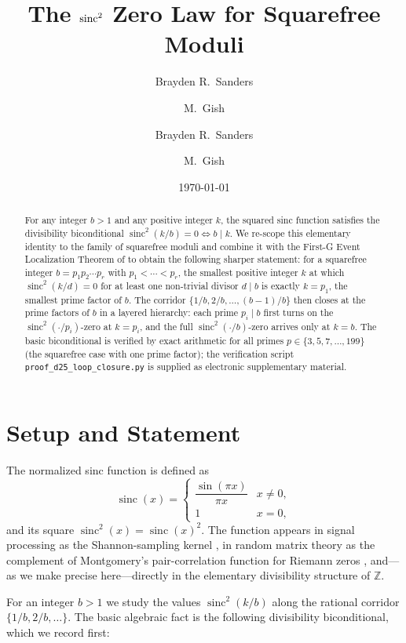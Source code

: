 \documentclass[11pt,reqno]{amsart}
\title[The sinc\texorpdfstring{$^2$}{\^{}2} zero law for squarefree moduli]{The \texorpdfstring{$\sinc^2$}{sinc\^{}2} Zero Law for Squarefree Moduli}
\author{Brayden R.\ Sanders \and M.\ Gish}
\author{Brayden R.\ Sanders \and M.\ Gish}
\date{\today}
\theoremstyle{plain}
\theoremstyle{remark}
\DeclareMathOperator{\sinc}{sinc}
\newcommand{\Z}{\mathbb{Z}}
\begin{document}
\begin{abstract}
For any integer $b > 1$ and any positive integer $k$, the squared
sinc function satisfies the divisibility biconditional
$\sinc^2(k/b) = 0 \iff b \mid k$. We re-scope this elementary
identity to the family of squarefree moduli and combine it with the
First-G Event Localization Theorem of \cite{J41} to obtain the
following sharper statement: for a squarefree integer
$b = p_1 p_2 \cdots p_r$ with $p_1 < \cdots < p_r$, the smallest
positive integer $k$ at which $\sinc^2(k/d) = 0$ for at least one
non-trivial divisor $d \mid b$ is exactly $k = p_1$, the smallest
prime factor of $b$. The corridor
$\{1/b, 2/b, \ldots, (b-1)/b\}$ then closes at the prime factors of
$b$ in a layered hierarchy: each prime $p_i \mid b$ first turns on
the $\sinc^2(\cdot/p_i)$-zero at $k = p_i$, and the full
$\sinc^2(\cdot/b)$-zero arrives only at $k = b$. The basic
biconditional is verified by exact arithmetic for all primes
$p \in \{3, 5, 7, \ldots, 199\}$ (the squarefree case with one prime
factor); the verification script
\texttt{proof\_d25\_loop\_closure.py} is supplied as electronic
supplementary material.
\end{abstract}

\maketitle

\section{Setup and Statement}\label{sec:setup}

The normalized sinc function is defined as
\begin{equation}\label{eq:sinc-def}
  \sinc(x) =
  \begin{cases}
     \dfrac{\sin(\pi x)}{\pi x} & x \neq 0,\\[4pt]
     1 & x = 0,
  \end{cases}
\end{equation}
and its square $\sinc^2(x) = \sinc(x)^2$. The function appears in
signal processing as the Shannon-sampling kernel
\cite{Shannon1949}, in random matrix theory as the complement of
Montgomery's pair-correlation function for Riemann zeros
\cite{Montgomery1973}, and---as we make precise here---directly in
the elementary divisibility structure of $\Z$.

For an integer $b > 1$ we study the values $\sinc^2(k/b)$ along the
rational corridor $\{1/b, 2/b, \ldots\}$. The basic algebraic fact
is the following divisibility biconditional, which we record first:
\end{document}
